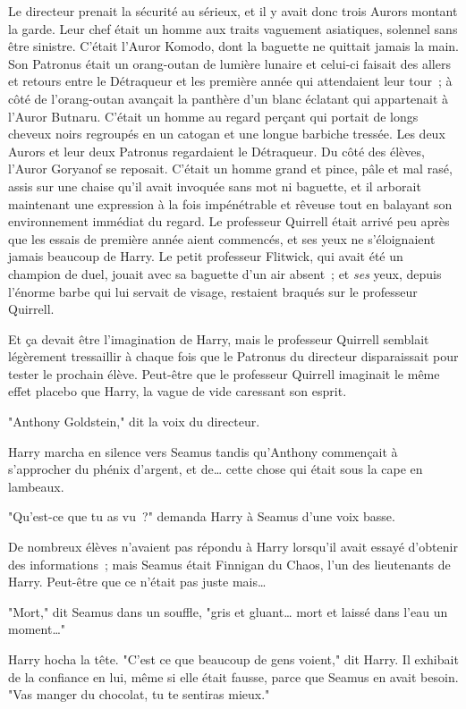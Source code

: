 Le directeur prenait la sécurité au sérieux, et il y avait donc trois Aurors montant la garde. Leur chef était un homme aux traits vaguement asiatiques, solennel sans être sinistre. C'était l'Auror Komodo, dont la baguette ne quittait jamais la main. Son Patronus était un orang-outan de lumière lunaire et celui-ci faisait des allers et retours entre le Détraqueur et les première année qui attendaient leur tour~; à côté de l'orang-outan avançait la panthère d'un blanc éclatant qui appartenait à l'Auror Butnaru. C'était un homme au regard perçant qui portait de longs cheveux noirs regroupés en un catogan et une longue barbiche tressée. Les deux Aurors et leur deux Patronus regardaient le Détraqueur. Du côté des élèves, l'Auror Goryanof se reposait. C'était un homme grand et pince, pâle et mal rasé, assis sur une chaise qu'il avait invoquée sans mot ni baguette, et il arborait maintenant une expression à la fois impénétrable et rêveuse tout en balayant son environnement immédiat du regard. Le professeur Quirrell était arrivé peu après que les essais de première année aient commencés, et ses yeux ne s'éloignaient jamais beaucoup de Harry. Le petit professeur Flitwick, qui avait été un champion de duel, jouait avec sa baguette d'un air absent~; et \emph{ses} yeux, depuis l'énorme barbe qui lui servait de visage, restaient braqués sur le professeur Quirrell.

Et ça devait être l'imagination de Harry, mais le professeur Quirrell semblait légèrement tressaillir à chaque fois que le Patronus du directeur disparaissait pour tester le prochain élève. Peut-être que le professeur Quirrell imaginait le même effet placebo que Harry, la vague de vide caressant son esprit.

"Anthony Goldstein," dit la voix du directeur.

Harry marcha en silence vers Seamus tandis qu'Anthony commençait à s'approcher du phénix d'argent, et de… cette chose qui était sous la cape en lambeaux.

"Qu'est-ce que tu as vu~?" demanda Harry à Seamus d'une voix basse.

De nombreux élèves n'avaient pas répondu à Harry lorsqu'il avait essayé d'obtenir des informations~; mais Seamus était Finnigan du Chaos, l'un des lieutenants de Harry. Peut-être que ce n'était pas juste mais…

"Mort," dit Seamus dans un souffle, "gris et gluant… mort et laissé dans l'eau un moment…"

Harry hocha la tête. "C'est ce que beaucoup de gens voient," dit Harry. Il exhibait de la confiance en lui, même si elle était fausse, parce que Seamus en avait besoin. "Vas manger du chocolat, tu te sentiras mieux."

